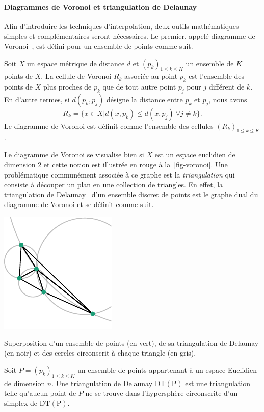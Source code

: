 \paragraph{Diagrammes de Voronoi et triangulation de Delaunay} Afin d'introduire les techniques d'interpolation, deux outils mathématiques simples et complémentaires seront nécessaires. Le premier, appelé diagramme de Voronoi~\cite{cazals2006delaunay}, est défini pour un ensemble de points comme suit.
\begin{mydef}
    Soit $X$ un espace métrique de distance $d$ et $(p_k)_{1\leq k\leq K}$ un ensemble de $K$ points de $X$. La cellule de Voronoi $R_k$ associée au point $p_k$ est l'ensemble des points de $X$ plus proches de $p_k$ que de tout autre point $p_j$ pour $j$ différent de $k$. En d'autre termes, si $d(p_k, p_j)$ désigne la distance entre $p_k$ et $p_j$, nous avons
    \[R_k=\{x\in X | d(x, p_k) \leq d(x, p_j) \ \forall j\neq k\}.\]
    Le diagramme de Voronoi est définit comme l'ensemble des cellules $(R_k)_{1\leq k\leq K}$.
\end{mydef}
Le diagramme de Voronoi se visualise bien si $X$ est un espace euclidien de dimension 2 et cette notion est illustrée en rouge à la~\cref{fig-voronoi}. Une problématique communément associée à ce graphe est la \emph{triangulation} qui consiste à découper un plan en une collection de triangles. En effet, la triangulation de Delaunay~\cite{cazals2006delaunay} d'un ensemble discret de points est le graphe dual du diagramme de Voronoi et se définit comme suit.
\begin{marginfigure}
    \centering
    \includegraphics[]{img/chapitre3/figure3/Delaunay.pdf}
    \caption{Superposition d'un ensemble de points (en vert), de sa triangulation de Delaunay (en noir) et des cercles circonscrit à chaque triangle (en gris).}
    \label{fig-delaunay}
\end{marginfigure}
\begin{mydef}
    Soit $P=(p_k)_{1\leq k\leq K}$ un ensemble de points appartenant à un espace Euclidien de dimension $n$. Une triangulation de Delaunay $\mathrm{DT(P)}$ est une triangulation telle qu'aucun point de $P$ ne se trouve dans l'hypersphère circonscrite d'un simplex de $\mathrm{DT(P)}$.
\end{mydef}
